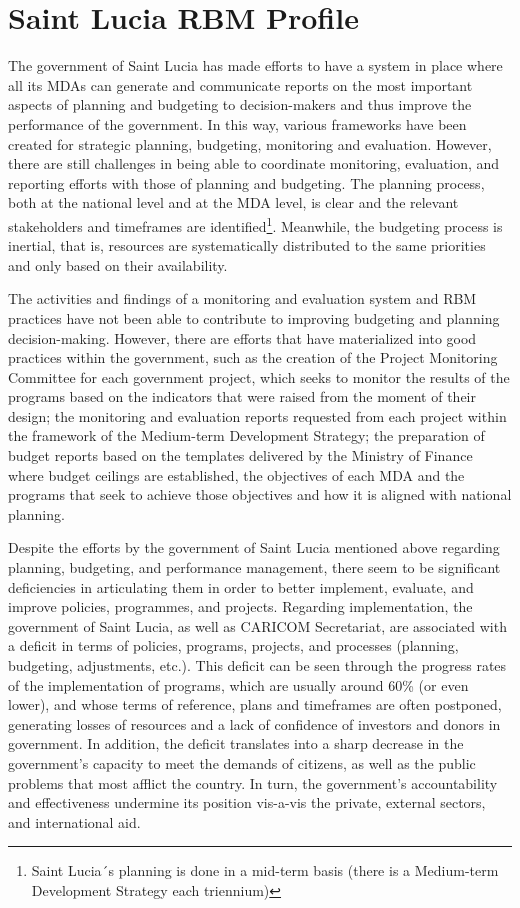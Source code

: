 \documentclass[
  10pt,
]{book}
\begin{document}
\hypertarget{saint-lucia-rbm-profile}{%
\section{Saint Lucia RBM Profile}\label{saint-lucia-rbm-profile}}

The government of Saint Lucia has made efforts to have a system in place where all its MDAs can generate and communicate reports on the most important aspects of planning and budgeting to decision-makers and thus improve the performance of the government. In this way, various frameworks have been created for strategic planning, budgeting, monitoring and evaluation. However, there are still challenges in being able to coordinate monitoring, evaluation, and reporting efforts with those of planning and budgeting.
The planning process, both at the national level and at the MDA level, is clear and the relevant stakeholders and timeframes are identified\footnote{ Saint Lucia´s planning is done in a mid-term basis (there is a Medium-term Development Strategy each triennium)}. Meanwhile, the budgeting process is inertial, that is, resources are systematically distributed to the same priorities and only based on their availability.

The activities and findings of a monitoring and evaluation system and RBM practices have not been able to contribute to improving budgeting and planning decision-making. However, there are efforts that have materialized into good practices within the government, such as the creation of the Project Monitoring Committee for each government project, which seeks to monitor the results of the programs based on the indicators that were raised from the moment of their design; the monitoring and evaluation reports requested from each project within the framework of the Medium-term Development Strategy; the preparation of budget reports based on the templates delivered by the Ministry of Finance where budget ceilings are established, the objectives of each MDA and the programs that seek to achieve those objectives and how it is aligned with national planning.

Despite the efforts by the government of Saint Lucia mentioned above regarding planning, budgeting, and performance management, there seem to be significant deficiencies in articulating them in order to better implement, evaluate, and improve policies, programmes, and projects. Regarding implementation, the government of Saint Lucia, as well as CARICOM Secretariat, are associated with a deficit in terms of policies, programs, projects, and processes (planning, budgeting, adjustments, etc.). This deficit can be seen through the progress rates of the implementation of programs, which are usually around 60\% (or even lower), and whose terms of reference, plans and timeframes are often postponed, generating losses of resources and a lack of confidence of investors and donors in government. In addition, the deficit translates into a sharp decrease in the government's capacity to meet the demands of citizens, as well as the public problems that most afflict the country. In turn, the government's accountability and effectiveness undermine its position vis-a-vis the private, external sectors, and international aid.
\end{document}
